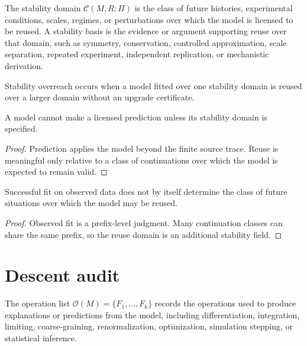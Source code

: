 \begin{definition}
\label{def:stability-domain-basis}
The stability domain $\mathcal C(M,R;\Pi)$ is the class of future histories, experimental conditions, scales, regimes, or perturbations over which the model is licensed to be reused. A stability basis is the evidence or argument supporting reuse over that domain, such as symmetry, conservation, controlled approximation, scale separation, repeated experiment, independent replication, or mechanistic derivation.
\end{definition}

\begin{definition}
\label{def:stability-overreach}
Stability overreach occurs when a model fitted over one stability domain is reused over a larger domain without an upgrade certificate.
\end{definition}

\begin{theorem}
\label{thm:prediction-requires-stability-domain-audit}
A model cannot make a licensed prediction unless its stability domain is specified.
\end{theorem}

\begin{proof}
Prediction applies the model beyond the finite source trace. Reuse is meaningful only relative to a class of continuations over which the model is expected to remain valid.
\end{proof}

\begin{corollary}
\label{cor:observed-success-not-own-domain}
Successful fit on observed data does not by itself determine the class of future situations over which the model may be reused.
\end{corollary}

\begin{proof}
Observed fit is a prefix-level judgment. Many continuation classes can share the same prefix, so the reuse domain is an additional stability field.
\end{proof}

\section{Descent audit}
\label{sec:descent-audit}

\begin{definition}
\label{def:operation-list-audit}
The operation list $\mathcal O(M)=\{F_1,\ldots,F_k\}$ records the operations used to produce explanations or predictions from the model, including differentiation, integration, limiting, coarse-graining, renormalization, optimization, simulation stepping, or statistical inference.
\end{definition}

